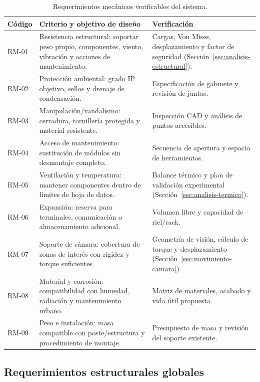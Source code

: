 \begin{table}[H]
  \centering
  \caption{Requerimientos mecánicos verificables del sistema.}
  \label{tab:requerimientos-mecanicos}
  \begin{tabularx}{\linewidth}{@{}l X X@{}}
    \toprule
    \textbf{Código} & \textbf{Criterio y objetivo de diseño} & \textbf{Verificación} \\
    \midrule
    RM-01 & Resistencia estructural: soportar peso propio, componentes, viento, vibración y acciones de mantenimiento. & Cargas, Von Mises, desplazamiento y factor de seguridad (Sección~\ref{sec:analisis-estructural}). \\
    RM-02 & Protección ambiental: grado IP objetivo, sellos y drenaje de condensación. & Especificación de gabinete y revisión de juntas. \\
    RM-03 & Manipulación/vandalismo: cerradura, tornillería protegida y material resistente. & Inspección CAD y análisis de puntos accesibles. \\
    RM-04 & Acceso de mantenimiento: sustitución de módulos sin desmontaje completo. & Secuencia de apertura y espacio de herramientas. \\
    RM-05 & Ventilación y temperatura: mantener componentes dentro de límites de hoja de datos. & Balance térmico y plan de validación experimental (Sección~\ref{sec:analisis-termico}). \\
    RM-06 & Expansión: reserva para terminales, comunicación o almacenamiento adicional. & Volumen libre y capacidad de riel/rack. \\
    RM-07 & Soporte de cámara: cobertura de zonas de interés con rigidez y torque suficientes. & Geometría de visión, cálculo de torque y desplazamiento (Sección~\ref{sec:movimiento-camara}). \\
    RM-08 & Material y corrosión: compatibilidad con humedad, radiación y mantenimiento urbano. & Matriz de materiales, acabado y vida útil propuesta. \\
    RM-09 & Peso e instalación: masa compatible con poste/estructura y procedimiento de montaje. & Presupuesto de masa y revisión del soporte existente. \\
    \bottomrule
  \end{tabularx}
\end{table}

\subsection{Requerimientos estructurales globales}\label{subsec:requerimientos-estructurales}

